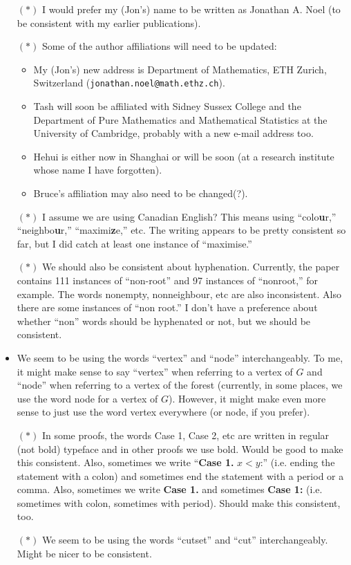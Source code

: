 \documentclass[11 pt]{article}
\theoremstyle{definition}
\theoremstyle{case}
\numberwithin{equation}{section}
\begin{document}
\begin{itemize}
\item[$\boldsymbol{(*)}$] I would prefer my (Jon's) name to be written as Jonathan A. Noel (to be consistent with my earlier publications). 
\item[$\boldsymbol{(*)}$] Some of the author affiliations will need to be updated:
\begin{itemize}
\item My (Jon's) new address is Department of Mathematics, ETH Zurich, Switzerland
(\texttt{jonathan.noel@math.ethz.ch}).
\item Tash will soon be affiliated with Sidney Sussex College and the Department of Pure Mathematics and Mathematical Statistics at the University of Cambridge, probably with a new e-mail address too. 
\item Hehui is either now in Shanghai or will be soon (at a research institute whose name I have forgotten).
\item Bruce's affiliation may also need to be changed(?).
\end{itemize}
\item[$\boldsymbol{(*)}$] I assume we are using Canadian English? This means using ``colo\textbf{u}r,'' ``neighbo\textbf{u}r,'' ``maximi\textbf{z}e,'' etc. The writing appears to be pretty consistent so far, but I did catch at least one instance of ``maximise.''
\item[$\boldsymbol{(*)}$] We should also be consistent about hyphenation. Currently, the paper contains 111 instances of ``non-root'' and 97 instances of ``nonroot,'' for example. The words nonempty, nonneighbour, etc are also inconsistent. Also there are some instances of ``non root.'' I don't have a preference about whether ``non'' words should be hyphenated or not, but we should be consistent. 
\item We seem to be using the words ``vertex'' and ``node'' interchangeably. To me, it might make sense to say ``vertex'' when referring to a vertex of $G$ and ``node'' when referring to a vertex of the forest (currently, in some places, we use the word node for a vertex of $G$). However, it might make even more sense to just use the word vertex everywhere (or node, if you prefer). 
\item[$\boldsymbol{(*)}$] In some proofs, the words Case 1, Case 2, etc are written in regular (not bold) typeface and in other proofs we use bold. Would be good to make this consistent. Also, sometimes we write ``\textbf{Case 1.} $x<y$:'' (i.e. ending the statement with a colon) and sometimes end the statement with a period or a comma. Also, sometimes we write \textbf{Case 1.} and sometimes \textbf{Case 1:} (i.e. sometimes with colon, sometimes with period). Should make this consistent, too. 
\item[$\boldsymbol{(*)}$] We seem to be using the words ``cutset'' and ``cut'' interchangeably. Might be nicer to be consistent. 
\end{itemize}
\end{document}
